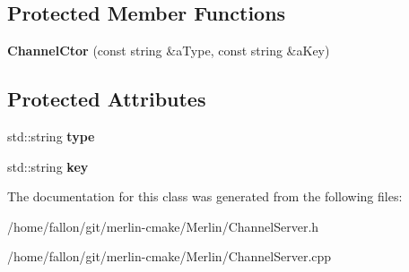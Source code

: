 \subsection*{Protected Member Functions}
\begin{DoxyCompactItemize}
\item 
\mbox{\label{classChannelServer_1_1ChannelCtor_a90a2a06743e7e77bd59135e3835fcda0}} 
{\bfseries Channel\+Ctor} (const string \&a\+Type, const string \&a\+Key)
\end{DoxyCompactItemize}
\subsection*{Protected Attributes}
\begin{DoxyCompactItemize}
\item 
\mbox{\label{classChannelServer_1_1ChannelCtor_a07645ac6a004b22887e5631cd3a9cbc9}} 
std\+::string {\bfseries type}
\item 
\mbox{\label{classChannelServer_1_1ChannelCtor_af1452bd1601ae3b9dff497745fa162b7}} 
std\+::string {\bfseries key}
\end{DoxyCompactItemize}


The documentation for this class was generated from the following files\+:\begin{DoxyCompactItemize}
\item 
/home/fallon/git/merlin-\/cmake/\+Merlin/Channel\+Server.\+h\item 
/home/fallon/git/merlin-\/cmake/\+Merlin/Channel\+Server.\+cpp\end{DoxyCompactItemize}
